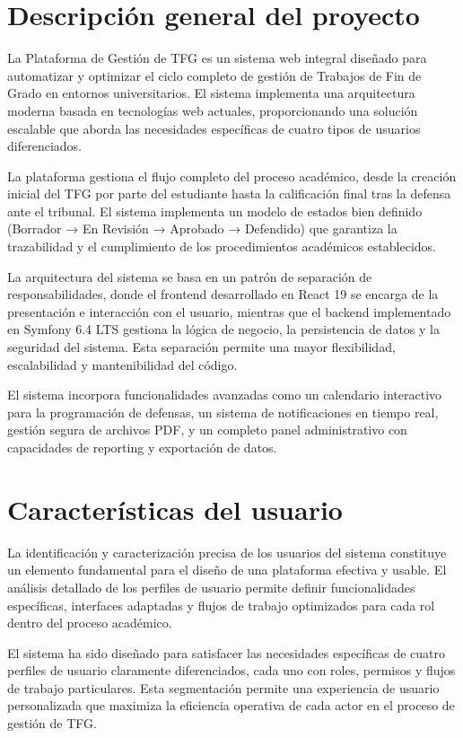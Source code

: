 \documentclass[12pt,a4paper,oneside]{report}
\begin{document}
\section{Descripción general del
proyecto}\label{descripciuxf3n-general-del-proyecto}

La Plataforma de Gestión de TFG es un sistema web integral diseñado para
automatizar y optimizar el ciclo completo de gestión de Trabajos de Fin
de Grado en entornos universitarios. El sistema implementa una
arquitectura moderna basada en tecnologías web actuales, proporcionando
una solución escalable que aborda las necesidades específicas de cuatro
tipos de usuarios diferenciados.

La plataforma gestiona el flujo completo del proceso académico, desde la
creación inicial del TFG por parte del estudiante hasta la calificación
final tras la defensa ante el tribunal. El sistema implementa un modelo
de estados bien definido (Borrador → En Revisión → Aprobado → Defendido)
que garantiza la trazabilidad y el cumplimiento de los procedimientos
académicos establecidos.

La arquitectura del sistema se basa en un patrón de separación de
responsabilidades, donde el frontend desarrollado en React 19 se encarga
de la presentación e interacción con el usuario, mientras que el backend
implementado en Symfony 6.4 LTS gestiona la lógica de negocio, la
persistencia de datos y la seguridad del sistema. Esta separación
permite una mayor flexibilidad, escalabilidad y mantenibilidad del
código.

El sistema incorpora funcionalidades avanzadas como un calendario
interactivo para la programación de defensas, un sistema de
notificaciones en tiempo real, gestión segura de archivos PDF, y un
completo panel administrativo con capacidades de reporting y exportación
de datos.

\section{Características del
usuario}\label{caracteruxedsticas-del-usuario}

La identificación y caracterización precisa de los usuarios del sistema
constituye un elemento fundamental para el diseño de una plataforma
efectiva y usable. El análisis detallado de los perfiles de usuario
permite definir funcionalidades específicas, interfaces adaptadas y
flujos de trabajo optimizados para cada rol dentro del proceso
académico.

El sistema ha sido diseñado para satisfacer las necesidades específicas
de cuatro perfiles de usuario claramente diferenciados, cada uno con
roles, permisos y flujos de trabajo particulares. Esta segmentación
permite una experiencia de usuario personalizada que maximiza la
eficiencia operativa de cada actor en el proceso de gestión de TFG.
\end{document}
